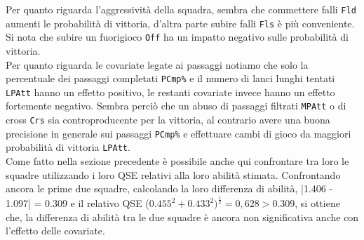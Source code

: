 Per quanto riguarda l'aggressività della squadra, sembra che commettere falli \texttt{Fld} aumenti le probabilità di vittoria, d'altra parte subire falli \texttt{Fls} è più conveniente.\\ 
Si nota che subire un fuorigioco \texttt{Off} ha un impatto negativo sulle probabilità di vittoria.\\
Per quanto riguarda le covariate legate ai passaggi notiamo che solo la percentuale dei passaggi completati \texttt{PCmp\%} e il numero di lanci lunghi tentati \texttt{LPAtt} hanno un effetto positivo, le restanti covariate invece hanno un effetto fortemente negativo. Sembra perciò che un abuso di passaggi filtrati \texttt{MPAtt} o di cross \texttt{Crs} sia controproducente per la vittoria, al contrario avere una buona precisione in generale sui passaggi \texttt{PCmp\%} e effettuare cambi di gioco da maggiori probabilità di vittoria \texttt{LPAtt}. \\

Come fatto nella sezione precedente è possibile anche qui confrontare tra loro le squadre utilizzando i loro QSE relativi alla loro abilità stimata.
Confrontando ancora le prime due squadre, calcolando la loro differenza di abilità, |1.406 - 1.097| = 0.309 e il relativo QSE ($0.455^2 + 0.433^2)^\frac{1}{2}=0,628 > 0.309$, si ottiene che, la differenza di abilità tra le due squadre è ancora non significativa anche con l’effetto delle covariate.

